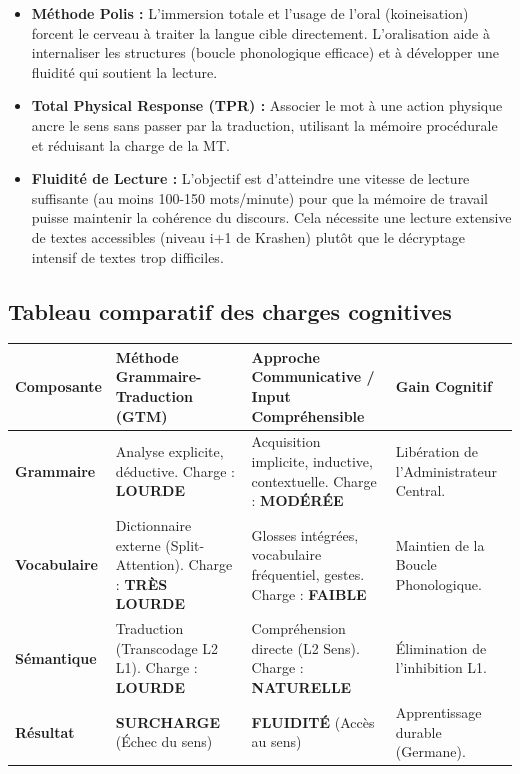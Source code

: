 \begin{itemize}\item \textbf{Méthode Polis :} L'immersion totale et l'usage de l'oral (koineisation) forcent le cerveau à traiter la langue cible directement. L'oralisation aide à internaliser les structures (boucle phonologique efficace) et à développer une fluidité qui soutient la lecture.\cite{II-1-3-ref38}\item \textbf{Total Physical Response (TPR) :} Associer le mot à une action physique ancre le sens sans passer par la traduction, utilisant la mémoire procédurale et réduisant la charge de la MT.\cite{II-1-3-ref49}\item \textbf{Fluidité de Lecture :} L'objectif est d'atteindre une vitesse de lecture suffisante (au moins 100-150 mots/minute) pour que la mémoire de travail puisse maintenir la cohérence du discours. Cela nécessite une lecture extensive de textes accessibles (niveau i+1 de Krashen) plutôt que le décryptage intensif de textes trop difficiles.\cite{II-1-3-ref51}\end{itemize}

\subsection{Tableau comparatif des charges cognitives}

\begin{table}[h!]\small\centering\begin{tabular}{| p{2cm} | p{2.2cm} | p{2.2cm} | p{2.2cm} |}\hline\textbf{Composante} & \textbf{Méthode Grammaire-Traduction (GTM)} & \textbf{Approche Communicative / Input Compréhensible} & \textbf{Gain Cognitif} \\ \hline\textbf{Grammaire} & Analyse explicite, déductive. Charge : \textbf{LOURDE} & Acquisition implicite, inductive, contextuelle. Charge : \textbf{MODÉRÉE} & Libération de l'Administrateur Central. \\ \hline\textbf{Vocabulaire} & Dictionnaire externe (Split-Attention). Charge : \textbf{TRÈS LOURDE} & Glosses intégrées, vocabulaire fréquentiel, gestes. Charge : \textbf{FAIBLE} & Maintien de la Boucle Phonologique. \\ \hline\textbf{Sémantique} & Traduction (Transcodage L2 \-\> L1). Charge : \textbf{LOURDE} & Compréhension directe (L2 \-\> Sens). Charge : \textbf{NATURELLE} & Élimination de l'inhibition L1. \\ \hline\textbf{Résultat} & \textbf{SURCHARGE} (Échec du sens) & \textbf{FLUIDITÉ} (Accès au sens) & Apprentissage durable (Germane). \\ \hline\end{tabular}\end{table}

